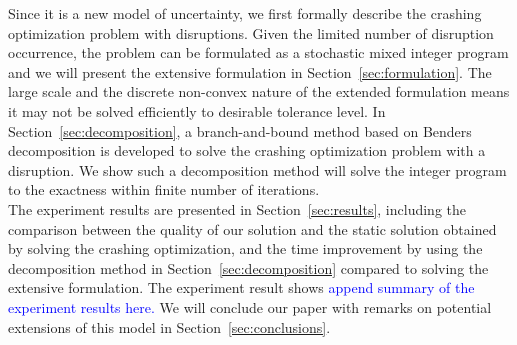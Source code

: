 \documentclass[11pt]{article}
\begin{document}
	\newline
	Since it is a new model of uncertainty, we first formally describe the crashing optimization problem with disruptions. Given the limited number of disruption occurrence, the problem can be formulated as a stochastic mixed integer program and we will present the extensive formulation in Section~\ref{sec:formulation}. The large scale and the discrete non-convex nature of the extended formulation means it may not be solved efficiently to desirable tolerance level. In Section~\ref{sec:decomposition}, a branch-and-bound method based on Benders decomposition is developed to solve the crashing optimization problem with a disruption. We show such a decomposition method will solve the integer program to the exactness within finite number of iterations. \\
	\newline
	The experiment results are presented in Section~\ref{sec:results}, including the comparison between the quality of our solution and the static solution obtained by solving the crashing optimization, and the time improvement by using the decomposition method in Section~\ref{sec:decomposition} compared to solving the extensive formulation. The experiment result shows \textcolor{blue}{append summary of the experiment results here.} We will conclude our paper with remarks on potential extensions of this model in Section~\ref{sec:conclusions}.
	
\end{document}
